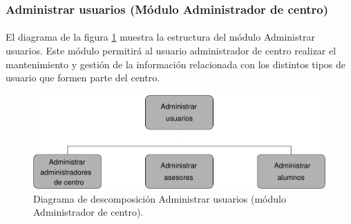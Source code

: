 \subsubsection{Administrar usuarios (Módulo Administrador de centro)}

  \paragraph{}El diagrama de la figura
  \ref{diagramaDescomposicionAdministrarUsuarios-admCentro} muestra la
  estructura del módulo Administrar usuarios. Este módulo permitirá al usuario
  administrador de centro realizar el mantenimiento y gestión de la información
  relacionada con los distintos tipos de usuario que formen parte del centro.

  \begin{figure}[!ht]
    \begin{center}
      \includegraphics[]{11.Disenyo_Arquitectonico/11.2.Diagramas_Descomposicion/11.2.3.Modulo_administrador_centro/AdministrarBBDD/AdministrarUsuarios/Diagramas/administrar_usuarios.pdf}
      \caption{Diagrama de descomposición Administrar usuarios (módulo Administrador de centro).}
      \label{diagramaDescomposicionAdministrarUsuarios-admCentro}
    \end{center}
  \end{figure}

 
 
 